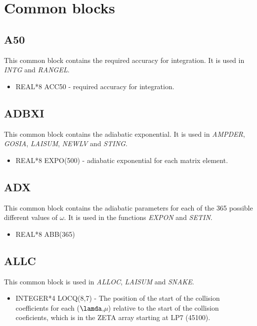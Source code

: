 \chapter{Common blocks}

\section{A50}

This common block contains the required accuracy for integration. It is used
in {\em INTG} and {\em RANGEL}.

\begin{itemize}
\item REAL*8 ACC50 - required accuracy for integration.
\end{itemize}

\section{ADBXI}

This common block contains the adiabatic exponential. It is used in {\em
AMPDER}, {\em GOSIA}, {\em LAISUM}, {\em NEWLV} and {\em STING}.

\begin{itemize}
\item REAL*8 EXPO(500) - adiabatic exponential for each matrix element.
\end{itemize}

\section{ADX}

This common block contains the adiabatic parameters for each of the 365
possible different values of $\omega$. It is used in the functions {\em
EXPON} and {\em SETIN}.\\

\begin{itemize}
\item REAL*8 ABB(365)
\end{itemize}

\section{ALLC}

This common block is used in {\em ALLOC}, {\em LAISUM} and {\em SNAKE}.

\begin{itemize}
\item INTEGER*4 LOCQ(8,7) - The position of the start of the collision
coefficients for each ($\lamda$,$\mu$) relative to the start of the
collision coeficients, which is in the ZETA array starting at LP7 (45100).
\end{itemize}

